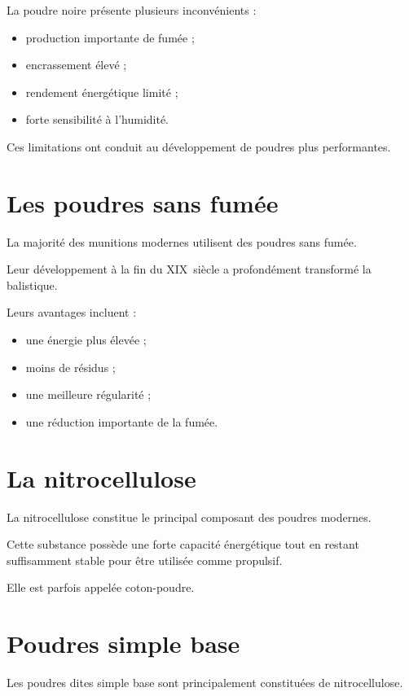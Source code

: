 La poudre noire présente plusieurs inconvénients :

\begin{itemize}
    \item production importante de fumée ;
    \item encrassement élevé ;
    \item rendement énergétique limité ;
    \item forte sensibilité à l'humidité.
\end{itemize}

Ces limitations ont conduit au développement de poudres plus performantes.

\section{Les poudres sans fumée}

La majorité des munitions modernes utilisent des poudres sans fumée.

Leur développement à la fin du XIX\ieme\ siècle a profondément transformé la
balistique.

Leurs avantages incluent :

\begin{itemize}
    \item une énergie plus élevée ;
    \item moins de résidus ;
    \item une meilleure régularité ;
    \item une réduction importante de la fumée.
\end{itemize}

\section{La nitrocellulose}

La nitrocellulose constitue le principal composant des poudres modernes.

Cette substance possède une forte capacité énergétique tout en restant
suffisamment stable pour être utilisée comme propulsif.

Elle est parfois appelée coton-poudre.

\section{Poudres simple base}

Les poudres dites simple base sont principalement constituées de
nitrocellulose.

